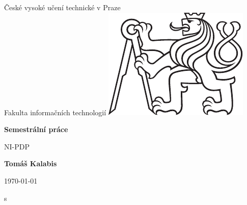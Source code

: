 \begin{titlepage}
   \begin{center}
        
        \Large
        České vysoké učení technické v Praze\\
        Fakulta informačních technologií 
        \vspace*{1cm}
        \FloatBarrier
        \includegraphics[width=0.4\linewidth]{images/symbol_cvut_konturova_verze_cb.pdf}
        
        \vspace*{1cm}
        \Huge
        \textbf{Semestrální práce}
        
        
       \vspace{0.5cm}
        \LARGE
        NI-PDP
            
       \vspace{1.5cm}

       \textbf{Tomáš Kalabis}

       \vfill
            


     
            
       \today
            
   \end{center}
\end{titlepage}s